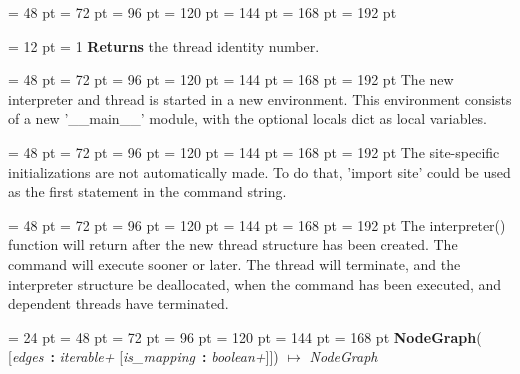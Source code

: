 {{{{{{{\par}
\par}
\par}
\par}
{\par \noindent  \leftskip = 48 pt  \leftmargini = 72 pt  \leftmarginii = 96 pt  \leftmarginiii = 120 pt  \leftmarginiv = 144 pt  \leftmarginv = 168 pt  \leftmarginvi = 192 pt {\par \noindent
{\par \pagebreak[3.100000] \noindent \hangindent = 12 pt \hangafter = 1 
{\bf Returns \/} the thread identity number.\par}
\par}
\par}
{\par \noindent  \leftskip = 48 pt  \leftmargini = 72 pt  \leftmarginii = 96 pt  \leftmarginiii = 120 pt  \leftmarginiv = 144 pt  \leftmarginv = 168 pt  \leftmarginvi = 192 pt The new interpreter and thread is started in a new environment.  This
environment consists of a new '{\_}{\_}main{\_}{\_}' module, with the optional
locals dict as local variables.\par}
{\par \noindent  \leftskip = 48 pt  \leftmargini = 72 pt  \leftmarginii = 96 pt  \leftmarginiii = 120 pt  \leftmarginiv = 144 pt  \leftmarginv = 168 pt  \leftmarginvi = 192 pt The site-specific initializations are not automatically made. To do
that, 'import site' could be used as the first statement in the
command string.\par}
{\par \noindent  \leftskip = 48 pt  \leftmargini = 72 pt  \leftmarginii = 96 pt  \leftmarginiii = 120 pt  \leftmarginiv = 144 pt  \leftmarginv = 168 pt  \leftmarginvi = 192 pt The interpreter() function will return after the new thread structure
has been created. The command will execute sooner or later.  The
thread will terminate, and the interpreter structure be deallocated,
when the command has been executed, and dependent threads have
terminated.
\par}
\par}
\par}
{\par \noindent  \leftskip = 24 pt  \leftmargini = 48 pt  \leftmarginii = 72 pt  \leftmarginiii = 96 pt  \leftmarginiv = 120 pt  \leftmarginv = 144 pt  \leftmarginvi = 168 pt {\bf {\large {\bf NodeGraph\/}}\/}( {[}{\em edges\/}~{\bf :}  {\em iterable+\/}  {[}{\em is{\_}mapping\/}~{\bf :}  {\em boolean+\/}]]) \(\mapsto \)  {\em NodeGraph\/}{\par \noindent
}}}
